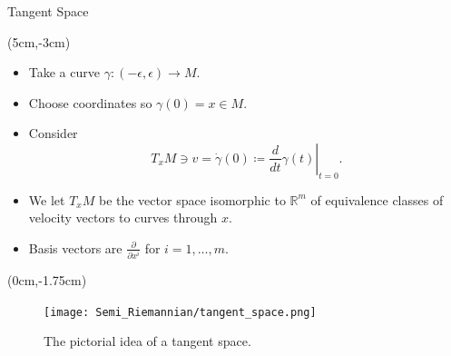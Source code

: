 \documentclass[usenames,dvipsnames]{beamer}
\theoremstyle{definition}
\theoremstyle{theorem}
\newcommand{\R}{\mathbb{R}}
\begin{document}
        \begin{frame}{Tangent Space}
            \begin{textblock*}{6cm}(5cm,-3cm)
            \begin{itemize}
                \item Take a curve $\gamma \colon (-\epsilon,\epsilon)\to M$.
                \item Choose coordinates so $\gamma(0)=x\in M$.
                \item Consider 
                \[
                T_xM\ni v= \dot{\gamma}(0)\coloneqq \left.\frac{d}{dt}\gamma(t)\right|_{t=0}.
                \]
                \item We let $T_xM$ be the vector space isomorphic to $\R^m$ of equivalence classes of velocity vectors to curves through $x$.
                \item Basis vectors are $\frac{\partial}{\partial x^i}$ for $i=1,\dots,m$.
            \end{itemize}
            \end{textblock*}
            \begin{textblock*}{5cm}(0cm,-1.75cm)
            \begin{figure}
            \centering
            \texttt{[image: Semi\_Riemannian/tangent\_space.png]}
            \caption{The pictorial idea of a tangent space.}
            \label{fig:my_label}
        \end{figure}
            \end{textblock*}
        \end{frame}
        
    
\end{document}

